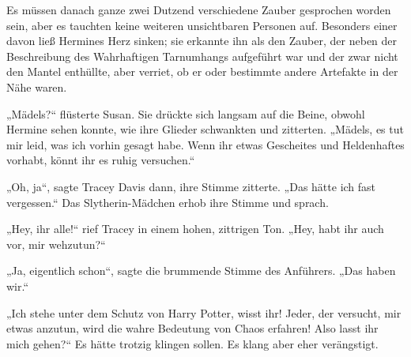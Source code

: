 Es müssen danach ganze zwei Dutzend verschiedene Zauber gesprochen worden sein, aber es tauchten keine weiteren unsichtbaren Personen auf. Besonders einer davon ließ Hermines Herz sinken; sie erkannte ihn als den Zauber, der neben der Beschreibung des Wahrhaftigen Tarnumhangs aufgeführt war und der zwar nicht den Mantel enthüllte, aber verriet, ob er oder bestimmte andere Artefakte in der Nähe waren.

„Mädels?“ flüsterte Susan. Sie drückte sich langsam auf die Beine, obwohl Hermine sehen konnte, wie ihre Glieder schwankten und zitterten.
„Mädels, es tut mir leid, was ich vorhin gesagt habe. Wenn ihr etwas Gescheites und Heldenhaftes vorhabt, könnt ihr es ruhig versuchen.“

„Oh, ja“, sagte Tracey Davis dann, ihre Stimme zitterte.
„Das hätte ich fast vergessen.“ Das Slytherin-Mädchen erhob ihre Stimme und sprach.

„Hey, ihr alle!“ rief Tracey in einem hohen, zittrigen Ton.
„Hey, habt ihr auch vor, mir wehzutun?“

„Ja, eigentlich schon“, sagte die brummende Stimme des Anführers.
„Das haben wir.“

„Ich stehe unter dem Schutz von Harry Potter, wisst ihr! Jeder, der versucht, mir etwas anzutun, wird die wahre Bedeutung von Chaos erfahren! Also lasst ihr mich gehen?“ Es hätte trotzig klingen sollen. Es klang aber eher verängstigt.


